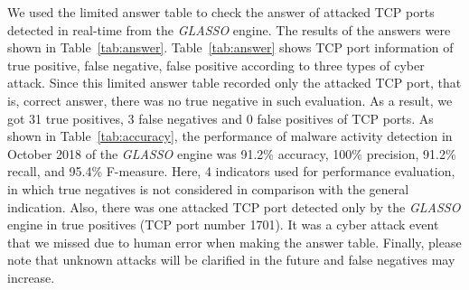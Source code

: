 \documentclass[conference]{IEEEtran}
\begin{document}
We used the limited answer table to check the answer of attacked TCP ports detected in real-time from the {\it GLASSO} engine.
The results of the answers were shown in Table~\ref{tab:answer}.
Table~\ref{tab:answer} shows TCP port information of true positive, false negative, false positive according to three types of cyber attack.
Since this limited answer table recorded only the attacked TCP port, that is, correct answer, there was no true negative in such evaluation.
As a result, we got 31 true positives, 3 false negatives and 0 false positives of TCP ports.
As shown in Table~\ref{tab:accuracy}, the performance of malware activity detection in October 2018 of the {\it GLASSO} engine was 91.2\% accuracy, 100\% precision, 91.2\% recall, and 95.4\% F-measure.
Here, 4 indicators used for performance evaluation, in which true negatives is not considered in comparison with the general indication.
Also, there was one attacked TCP port detected only by the {\it GLASSO} engine in true positives (TCP port number 1701).
It was a cyber attack event that we missed due to human error when making the answer table.
Finally, please note that unknown attacks will be clarified in the future and false negatives may increase.
\end{document}
